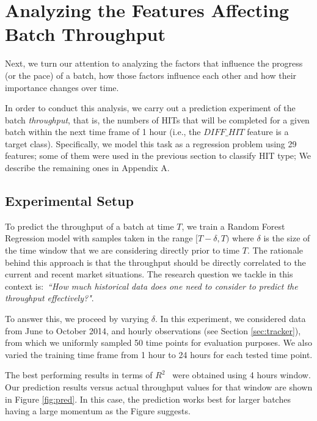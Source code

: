 \section{Analyzing the Features Affecting Batch Throughput}
\label{sec:throughput}
Next, we turn our attention to analyzing the factors that influence the progress (or the pace) of a batch, how those factors influence each other and how their importance changes over time. 

In order to conduct this analysis, we carry out a prediction experiment of the batch \emph{throughput}, that is, the numbers of HITs that  will be completed for a given batch within the next time frame of 1 hour (i.e.,  the $DIFF\_HIT$ feature is a target class).
Specifically, we model this task as a regression problem using 29 features; some of them were used in the previous section to classify HIT type; We describe the remaining ones in Appendix A.

\subsection{Experimental Setup}

To predict the throughput of a batch at time $T$, we train a Random Forest Regression model with samples taken in the range $[T-\delta, T)$ where $\delta$ is the size of the time window that we are   considering directly prior to time $T$. The rationale behind this approach is that the throughput should be directly correlated to the current and recent market situations. 
The research question we tackle in this context is:~\emph{``How much historical data does one need to consider to predict the throughput effectively?"}.
 
To answer this, we proceed by varying $\delta$. In this experiment, we considered  data from June to October 2014, and hourly observations (see Section \ref{sec:tracker}), from which we uniformly sampled 50 time points for evaluation purposes. 
We also varied the training time frame from 1 hour to 24 hours for each tested time point. 

The best performing results in terms of $R^2$~\cite{sklearnweb, sklearn} were obtained using 4 hours window. Our prediction results versus actual throughput values for that window are shown in Figure \ref{fig:pred}. In this case, the prediction works best for larger batches having a large momentum as the Figure suggests.



